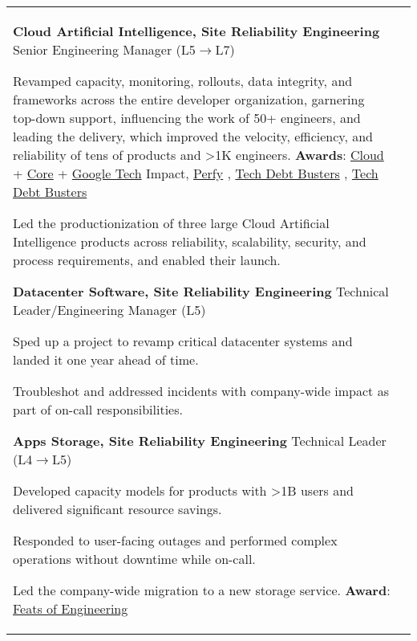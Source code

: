 \documentclass[letterpaper,10pt,oneside]{article}
\newcommand{\itemspacing}{\vspace{0.12cm}}
\newcommand{\sref}[2]{%
    \href{https://0/local/attachments/#1}{\textcolor{hiddenblue}{#2}}%
}
\newenvironment{body}
{\par\par
\begin{longtable}{p{0.145\textwidth}p{0.81\textwidth}}}
{\par\end{longtable}\par}
\begin{document}
\begin{body}
\phantom{g}\textbf{Cloud Artificial Intelligence, Site Reliability Engineering} \textemdash{ }Senior Engineering Manager (L5$\rightarrow$L7)
\begin{comp}
\item Revamped capacity, monitoring, rollouts, data integrity, and frameworks across the entire developer organization, garnering top-down support, influencing the work of 50+ engineers, and leading the delivery, which improved the velocity, efficiency, and reliability of tens of products and >1K engineers. \textbf{Awards}: \sref{Google-Award-GoogleCloudTechImpact-2022.pdf}{Cloud} + \sref{Google-Award-CoreTechImpact-2021.pdf}{Core} + \sref{Google-Award-GoogleTechImpact-2022.pdf}{Google Tech} Impact, \sref{Google-Award-Perfy.pdf}{Perfy}, \sref{Google-Award-TechDebtBusters1.pdf}{Tech Debt Busters}, \sref{Google-Award-TechDebtBusters2.pdf}{Tech Debt Busters}
\item Led the productionization of three large Cloud Artificial Intelligence products across reliability, scalability, security, and process requirements, and enabled their launch.
\end{comp}
\itemspacing

\phantom{g}\textbf{Datacenter Software, Site Reliability Engineering} \textemdash{ }Technical Leader/Engineering Manager (L5)
\begin{comp}
\item Sped up a project to revamp critical datacenter systems and landed it one year ahead of time.
\item Troubleshot and addressed incidents with company-wide impact as part of on-call responsibilities.
\end{comp}
\itemspacing

\phantom{g}\textbf{Apps Storage, Site Reliability Engineering} \textemdash{ }Technical Leader (L4$\rightarrow$L5)
\begin{comp}
\item Developed capacity models for products with >1B users and delivered significant resource savings.
\item Responded to user-facing outages and performed complex operations without downtime while on-call.
\item Led the company-wide migration to a new storage service. \textbf{Award}:\hspace{0.1cm}\sref{Google-Award-FeatsOfEngineering-2018.pdf}{Feats of Engineering}
\end{comp}
\itemspacing



\end{body}
\end{document}

